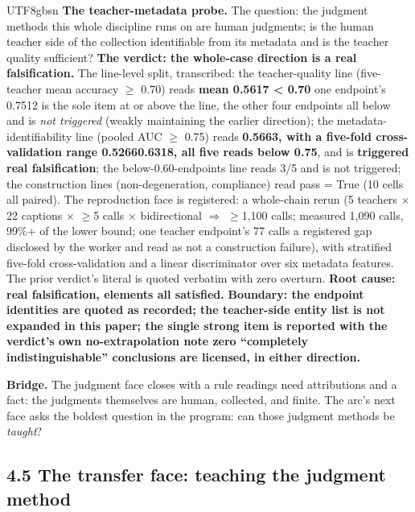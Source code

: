 \documentclass[11pt,letterpaper]{article}
\begin{document}
\begin{CJK}{UTF8}{gbsn}
\textbf{The teacher-metadata probe.} The question: the judgment methods this whole discipline runs on are human judgments; is the human teacher side of the collection identifiable from its metadata \textemdash{} and is the teacher quality sufficient? \textbf{The verdict: the whole-case direction is a real falsification.} The line-level split, transcribed: the teacher-quality line (five-teacher mean accuracy \ensuremath{\geq} 0.70) reads \textbf{mean 0.5617 < 0.70} \textemdash{} one endpoint's 0.7512 is the sole item at or above the line, the other four endpoints all below \textemdash{} and is \emph{not triggered} (weakly maintaining the earlier direction); the metadata-identifiability line (pooled AUC \ensuremath{\geq} 0.75) reads \textbf{0.5663, with a five-fold cross-validation range 0.5266\textendash{}0.6318, all five reads below 0.75}, and is \textbf{triggered \textemdash{} real falsification}; the below-0.60-endpoints line reads 3/5 and is not triggered; the construction lines (non-degeneration, compliance) read pass = True (10 cells all paired). The reproduction face is registered: a whole-chain rerun (5 teachers \ensuremath{\times} 22 captions \ensuremath{\times} \ensuremath{\geq}5 calls \ensuremath{\times} bidirectional \ensuremath{\Rightarrow} \ensuremath{\geq}1,100 calls; measured 1,090 calls, 99\%+ of the lower bound; one teacher endpoint's 77 calls a registered gap disclosed by the worker and read as not a construction failure), with stratified five-fold cross-validation and a linear discriminator over six metadata features. The prior verdict's literal is quoted verbatim with zero overturn. \textbf{Root cause: real falsification, elements  all satisfied.} \textbf{Boundary: the endpoint identities are quoted as recorded; the teacher-side entity list is not expanded in this paper; the single strong item is reported with the verdict's own no-extrapolation note \textemdash{} zero ``completely indistinguishable'' conclusions are licensed, in either direction.}

\textbf{Bridge.} The judgment face closes with a rule \textemdash{} readings need attributions \textemdash{} and a fact: the judgments themselves are human, collected, and finite. The arc's next face asks the boldest question in the program: can those judgment methods be \emph{taught}?

\subsection*{4.5 The transfer face: teaching the judgment method}


\end{CJK}
\end{document}
